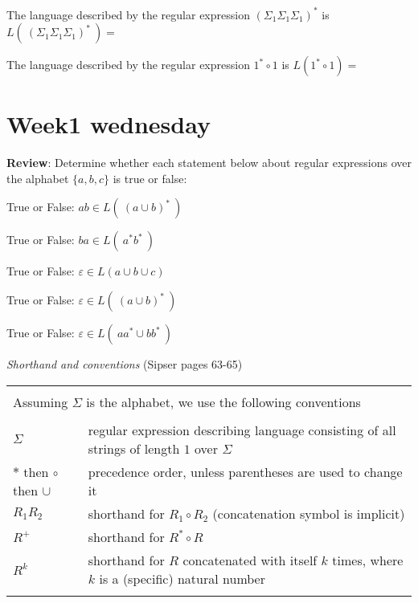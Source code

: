 \documentclass[12pt, oneside]{article}
\begin{document}
The language described by the regular expression $(\Sigma_1 \Sigma_1 \Sigma_1)^*$ 
is $L(~(\Sigma_1 \Sigma_1 \Sigma_1)^*~) = $

\vfill

The language described by the regular expression $1^* \circ 1$ is $L(1^* \circ 1) = $

\vfill
 \vfill
\section*{Week1 wednesday}



{\bf Review}: Determine whether each statement below about regular expressions
over the alphabet $\{a,b,c\}$ is true or false:

\begin{comment}
True or False: \qquad 
   $a  \in L(~(a \cup b )~\cup c)$
\end{comment}

True or False: \qquad 
   $ab  \in L(~ (a \cup b)^*  ~)$
   
True or False: \qquad    
   $ba \in L( ~ a^* b^* ~)$
   
True or False: \qquad 
   $\varepsilon  \in L(a \cup b \cup c)$
   
True or False: \qquad 
   $\varepsilon  \in L(~ (a \cup b)^*  ~)$

True or False: \qquad 
   $\varepsilon \in L( ~ aa^* \cup bb^* ~)$

\vfill

{\it Shorthand and conventions} (Sipser pages 63-65)

\vspace{-20pt}

\begin{center}
    \begin{tabular}{|ll|}
    \hline
    & \\
    \multicolumn{2}{|l|}{Assuming $\Sigma$ is the alphabet, we use the following conventions}\\
    & \\
    $\Sigma$   & regular  expression describing language consisting of  all strings  of length  $1$ over $\Sigma$\\
    $*$ then $\circ$ then $\cup$   & precedence order, unless parentheses are used to change it\\
    $R_1R_2$ & shorthand  for  $R_1  \circ R_2$ (concatenation symbol is implicit) \\
    $R^+$ & shorthand for $R^* \circ R$ \\
    $R^k$ & shorthand for $R$ concatenated with itself $k$ times, where $k$ is a (specific) natural number\\
    & \\
    \hline
    \end{tabular}
\end{center}
\end{document}
